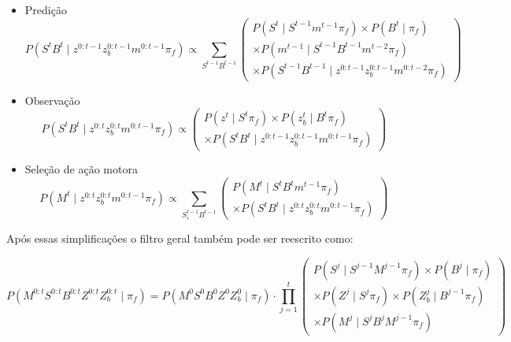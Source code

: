 \begin{itemize}
	\item Predição
		\begin{equation}
    P \left( S^t B^t \mid z^{0: t-1} z_b^{0: t-1} m^{0: t-1} \pi_f \right) \propto \sum\limits_{S^{t-1} B^{t-1}}
        \left(
            \begin{array}{l}
                P \left( S^t \mid S^{t-1} m^{t-1} \pi_f \right) \times P \left( B^t \mid \pi_f \right) \\
                \times P \left( m^{t-1} \mid S^{t-1} B^{t-1} m^{t-2} \pi_f \right)\\
                \times P \left( S^{t-1} B^{t-1} \mid z^{0: t-1} z_b^{0: t-1} m^{0: t-2} \pi_f \right)
            \end{array}
        \right)
		\end{equation}
	\item Observação
		\begin{equation}
    P \left( S^t B^t \mid z^{0: t} z_b^{0: t} m^{0: t-1} \pi_f \right) \propto
        \left(
            \begin{array}{l}
                P \left( z^t \mid S^t \pi_f \right) \times P \left( z_b^t \mid B^t \pi_f \right) \\
                \times P \left( S^t B^t \mid z^{0: t-1} z_b^{0: t-1} m^{0: t-1} \pi_f \right)
            \end{array}
        \right)
		\end{equation}
	\item Seleção de ação motora
		\begin{equation}
    P \left( M^t \mid z^{0: t} z_b^{0: t} m^{0: t-1} \pi_f \right) \propto \sum\limits_{S_i^{t-1} B^{t-1}}
        \left(
            \begin{array}{l}
                P \left( M^t \mid S^t B^t m^{t-1} \pi_f \right)\\
                \times P \left( S^t B^t \mid z^{0: t} z_b^{0: t} m^{0: t-1} \pi_f \right)
            \end{array}
        \right)
		\end{equation}
\end{itemize}

Após essas simplificações o filtro geral também pode ser reescrito como:

\begin{equation}
        P \left( M^{0: t} S^{0: t} B^{0: t} Z^{0: t} Z_b^{0: t} \mid \pi_f \right) = P \left( M^0 S^0 B^0 Z^0 Z_b^0 \mid \pi_f \right) \cdot \prod\limits_{j =1}^{t} 
        \left(
            \begin{array}{l}
                P \left( S^j \mid S^{j -1} M^{j -1} \pi_f \right) \times P \left( B^j \mid \pi_f \right) \\
                \times P \left( Z^j \mid S^j \pi_f \right) \times P \left( Z_b^j \mid B^{j-1} \pi_f \right) \\
                \times P \left( M^j \mid S^j B^j M^{j -1} \pi_f \right)
            \end{array}
        \right)
\end{equation}

